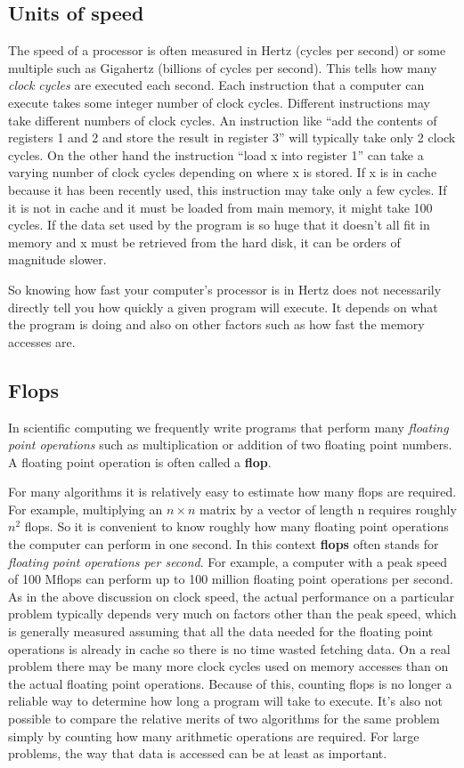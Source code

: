 \documentclass[letterpaper,10pt,english]{sphinxmanual}
\begin{document}
\subsection{Units of speed}
\label{metrics:units-of-speed}
The speed of a processor is often measured in Hertz (cycles per second)
or some multiple such as Gigahertz (billions of cycles per second).  This
tells how many \emph{clock cycles} are executed each second.  Each instruction
that a computer can execute takes some integer number of clock cycles.
Different instructions may take different numbers of clock cycles.  An
instruction like ``add the contents of registers 1 and 2 and store the result
in register 3'' will typically take only 2 clock cycles.  On the other hand
the instruction ``load x into register 1'' can take a varying number of clock
cycles depending on where x is stored. If x is in cache because it has been
recently used, this instruction may take only a few cycles.  If it is not in
cache and it must be loaded from main memory, it might take 100 cycles.  If
the data set used by the program is so huge that it doesn't all fit in
memory and x must be retrieved from the hard disk, it can be orders of
magnitude slower.

So knowing how fast your computer's processor is in Hertz does not
necessarily directly tell you how quickly a given program will execute.  It
depends on what the program is doing and also on other factors such as how
fast the memory accesses are.


\subsection{Flops}
\label{metrics:flops}\label{metrics:id2}
In scientific computing we frequently write programs that perform many
\emph{floating point operations} such as multiplication or addition of two
floating point numbers.  A floating point operation is often called
a \textbf{flop}.

For many algorithms it is relatively easy to estimate how many flops are
required.  For example, multiplying an \(n\times n\)
matrix by a vector of length n
requires roughly \(n^2\) flops.  So it is convenient to know roughly how
many floating point operations the computer can perform in one second.  In
this context \textbf{flops} often stands for \emph{floating point operations per
second}.  For example, a computer with a peak speed of 100 Mflops can
perform up to 100 million floating point operations per second.  As in the
above discussion on clock speed, the actual performance on a particular problem
typically depends very much on factors other than the peak speed, which is
generally measured assuming that all the data needed for the floating point
operations is already in cache so there is no time wasted fetching data.  On
a real problem there may be many more clock cycles used on memory accesses
than on the actual floating point operations.
Because of this, counting flops is no longer a reliable way to determine
how long a program will take to execute.  It's also not possible to
compare the relative merits of two algorithms for the same problem simply by
counting how many arithmetic operations are required.  For large problems,
the way that data is accessed can be at least as important.
\end{document}
